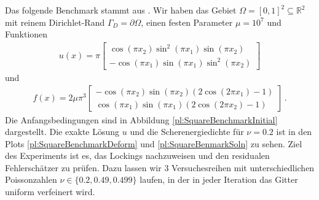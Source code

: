 \documentclass{scrartcl}
\def\R{\mathbb{R}}
\newcommand{\vect}[1]{\begin{bmatrix} #1 \end{bmatrix}}
\begin{document}
Das folgende Benchmark stammt aus \cite[Abschnitt 3.1]{Car-2011}.
Wir haben das Gebiet $\Omega=[0,1]^2\subseteq\R^2$ mit reinem Dirichlet-Rand $\Gamma_D=\partial\Omega$, einen festen Parameter $\mu=10^7$ und Funktionen
\begin{align*}
	u(x) = \pi\vect{\cos(\pi x_2)\sin^2(\pi x_1)\sin(\pi x_2) \\
	-\cos( \pi x_1)\sin(\pi  x_1)\sin^2(\pi  x_2)}
\end{align*}
und
\begin{align*}
	f(x) = 2\mu\pi^3\vect{-\cos(\pi x_2)\sin(\pi x_2)(2\cos(2\pi x_1)-1) \\
	\cos(\pi x_1)\sin(\pi x_1)(2\cos(2 \pi x_2)-1)}\,.
\end{align*}
Die Anfangsbedingungen sind in Abbildung \ref{pl:SquareBenchmarkInitial} dargestellt. Die exakte Lösung $u$ und die Scherenergiedichte für $\nu=0.2$ ist in den Plots \ref{pl:SquareBenchmarkDeform} und \ref{pl:SquareBenmarkSoln} zu sehen. Ziel des Experiments ist es, das Lockings nachzuweisen und den residualen Fehlerschätzer zu prüfen. Dazu lassen wir 3 Versuchesreihen mit unterschiedlichen Poissonzahlen $\nu\in\{0.2,0.49,0.499\}$ laufen, in der in jeder Iteration das Gitter uniform verfeinert wird.
\end{document}
